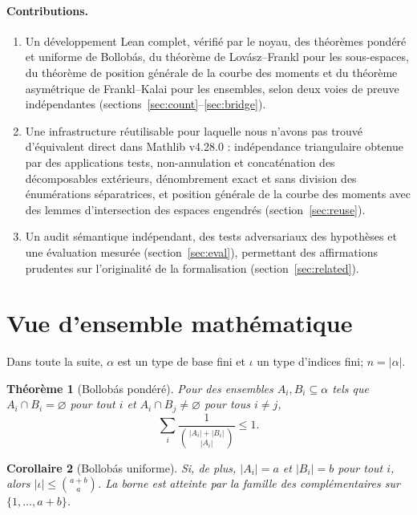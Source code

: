 \documentclass[11pt]{article}
\newtheorem{theorem}{Théorème}
\newtheorem{corollary}[theorem]{Corollaire}
\newcommand{\bind}[2]{\binom{#1}{#2}}
\begin{document}
\paragraph{Contributions.}
\begin{enumerate}
\item Un développement Lean complet, vérifié par le noyau, des théorèmes pondéré et
  uniforme de Bollobás, du théorème de Lovász--Frankl pour les sous-espaces, du théorème
  de position générale de la courbe des moments et du théorème asymétrique de
  Frankl--Kalai pour les ensembles, selon deux voies de preuve indépendantes
  (sections~\ref{sec:count}--\ref{sec:bridge}).
\item Une infrastructure réutilisable pour laquelle nous n'avons pas trouvé
d'équivalent direct dans Mathlib v4.28.0 : indépendance triangulaire obtenue par des
applications tests, non-annulation et concaténation des décomposables extérieurs,
dénombrement exact et sans division des énumérations séparatrices, et position générale
de la courbe des moments avec des lemmes d'intersection des espaces engendrés
(section~\ref{sec:reuse}).
\item Un audit sémantique indépendant, des tests adversariaux des hypothèses et une
évaluation mesurée (section~\ref{sec:eval}), permettant des affirmations prudentes sur
l'originalité de la formalisation (section~\ref{sec:related}).
\end{enumerate}

\section{Vue d'ensemble mathématique}\label{sec:overview}

Dans toute la suite, $\alpha$ est un type de base fini et $\iota$ un type d'indices fini;
$n=|\alpha|$.

\begin{theorem}[Bollobás pondéré]\label{thm:weighted}
Pour des ensembles $A_i,B_i\subseteq\alpha$ tels que $A_i\cap B_i=\varnothing$ pour
tout $i$ et $A_i\cap B_j\neq\varnothing$ pour tous $i\neq j$,
\[ \sum_i \frac{1}{\bind{|A_i|+|B_i|}{|A_i|}}\le 1. \]
\end{theorem}

\begin{corollary}[Bollobás uniforme]\label{thm:uniform}
Si, de plus, $|A_i|=a$ et $|B_i|=b$ pour tout $i$, alors
$|\iota|\le\bind{a+b}{a}$. La borne est atteinte par la famille des complémentaires sur
$\{1,\dots,a+b\}$.
\end{corollary}
\end{document}
